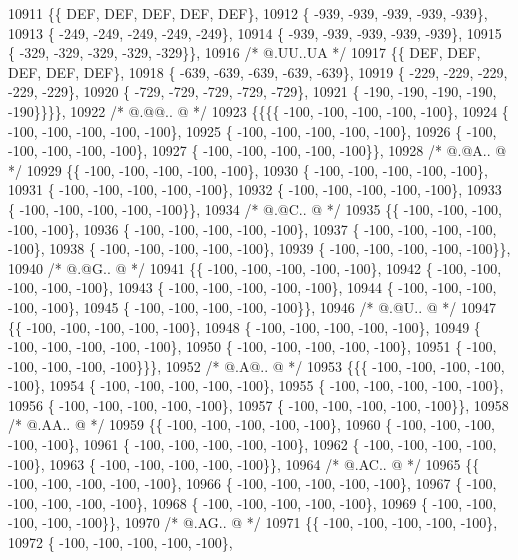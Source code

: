 \begin{DoxyCode}
10911 \{\{  DEF,  DEF,  DEF,  DEF,  DEF\},
10912 \{ -939, -939, -939, -939, -939\},
10913 \{ -249, -249, -249, -249, -249\},
10914 \{ -939, -939, -939, -939, -939\},
10915 \{ -329, -329, -329, -329, -329\}\},
10916 \textcolor{comment}{/*  @.UU..UA */}
10917 \{\{  DEF,  DEF,  DEF,  DEF,  DEF\},
10918 \{ -639, -639, -639, -639, -639\},
10919 \{ -229, -229, -229, -229, -229\},
10920 \{ -729, -729, -729, -729, -729\},
10921 \{ -190, -190, -190, -190, -190\}\}\}\},
10922 \textcolor{comment}{/*  @.@@.. @ */}
10923 \{\{\{\{ -100, -100, -100, -100, -100\},
10924 \{ -100, -100, -100, -100, -100\},
10925 \{ -100, -100, -100, -100, -100\},
10926 \{ -100, -100, -100, -100, -100\},
10927 \{ -100, -100, -100, -100, -100\}\},
10928 \textcolor{comment}{/*  @.@A.. @ */}
10929 \{\{ -100, -100, -100, -100, -100\},
10930 \{ -100, -100, -100, -100, -100\},
10931 \{ -100, -100, -100, -100, -100\},
10932 \{ -100, -100, -100, -100, -100\},
10933 \{ -100, -100, -100, -100, -100\}\},
10934 \textcolor{comment}{/*  @.@C.. @ */}
10935 \{\{ -100, -100, -100, -100, -100\},
10936 \{ -100, -100, -100, -100, -100\},
10937 \{ -100, -100, -100, -100, -100\},
10938 \{ -100, -100, -100, -100, -100\},
10939 \{ -100, -100, -100, -100, -100\}\},
10940 \textcolor{comment}{/*  @.@G.. @ */}
10941 \{\{ -100, -100, -100, -100, -100\},
10942 \{ -100, -100, -100, -100, -100\},
10943 \{ -100, -100, -100, -100, -100\},
10944 \{ -100, -100, -100, -100, -100\},
10945 \{ -100, -100, -100, -100, -100\}\},
10946 \textcolor{comment}{/*  @.@U.. @ */}
10947 \{\{ -100, -100, -100, -100, -100\},
10948 \{ -100, -100, -100, -100, -100\},
10949 \{ -100, -100, -100, -100, -100\},
10950 \{ -100, -100, -100, -100, -100\},
10951 \{ -100, -100, -100, -100, -100\}\}\},
10952 \textcolor{comment}{/*  @.A@.. @ */}
10953 \{\{\{ -100, -100, -100, -100, -100\},
10954 \{ -100, -100, -100, -100, -100\},
10955 \{ -100, -100, -100, -100, -100\},
10956 \{ -100, -100, -100, -100, -100\},
10957 \{ -100, -100, -100, -100, -100\}\},
10958 \textcolor{comment}{/*  @.AA.. @ */}
10959 \{\{ -100, -100, -100, -100, -100\},
10960 \{ -100, -100, -100, -100, -100\},
10961 \{ -100, -100, -100, -100, -100\},
10962 \{ -100, -100, -100, -100, -100\},
10963 \{ -100, -100, -100, -100, -100\}\},
10964 \textcolor{comment}{/*  @.AC.. @ */}
10965 \{\{ -100, -100, -100, -100, -100\},
10966 \{ -100, -100, -100, -100, -100\},
10967 \{ -100, -100, -100, -100, -100\},
10968 \{ -100, -100, -100, -100, -100\},
10969 \{ -100, -100, -100, -100, -100\}\},
10970 \textcolor{comment}{/*  @.AG.. @ */}
10971 \{\{ -100, -100, -100, -100, -100\},
10972 \{ -100, -100, -100, -100, -100\},

\end{DoxyCode}
